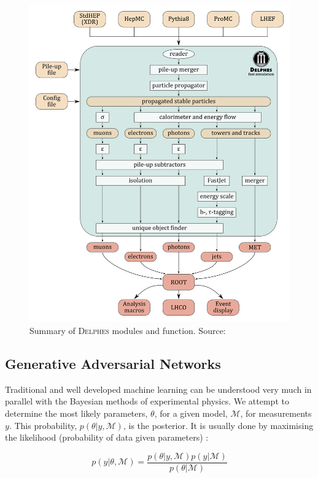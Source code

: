 \documentclass[twocolumn]{article}
\newcommand{\pkg}[1]{\textsc{#1}}
\begin{document}
\begin{figure}[H]
	\centering
	\includegraphics[width=1.0\columnwidth]{delphes}
	
	\caption{Summary of \pkg{Delphes} modules and function. Source: \cite{delphesslid}}
	\label{fig:delphes}
	
\end{figure}

 
\subsection{Generative Adversarial Networks}
\label{sec:ml}

Traditional and well developed machine learning can be understood very much in parallel with the Bayesian methods of experimental physics. We attempt to determine the most likely parameters, $\theta$, for a given model, $\mathcal{M}$, for measurements $y$. This probability, $p(\theta|y, \mathcal{M})$, is the posterior. It is usually done by maximising the likelihood (probability of data given parameters) \cite{data}:

\[
p(y|\theta, \mathcal{M}) = \frac{p(\theta|y, \mathcal{M})p(y|\mathcal{M})}{p(\theta|\mathcal{M})}
\]
\end{document}
